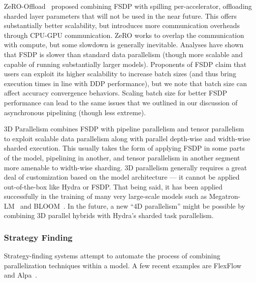ZeRO-Offload~\cite{zerooflload2021} proposed combining FSDP with spilling per-accelerator, offloading sharded layer parameters that will not be used in the near future. This offers substantially better scalability, but introduces more communication overheads through CPU-GPU communication. ZeRO works to overlap the communication with compute, but some slowdown is generally inevitable. Analyses have shown that FSDP is slower than standard data parallelism (though more scalable and capable of running substantially larger models). Proponents of FSDP claim that users can exploit its higher scalability to increase batch sizes (and thus bring execution times in line with DDP performance), but we note that batch size can affect accuracy convergence behaviors. Scaling batch size for better FSDP performance can lead to the same issues that we outlined in our discussion of asynchronous pipelining (though less extreme).

3D Parallelism combines FSDP with pipeline parallelism and tensor parallelism to exploit scalable data parallelism along with parallel depth-wise and width-wise sharded execution. This usually takes the form of applying FSDP in some parts of the model, pipelining in another, and tensor parallelism in another segment more amenable to width-wise sharding. 3D parallelism generally requires a great deal of customization based on the model architecture --- it cannot be applied out-of-the-box like Hydra or FSDP. That being said, it has been applied successfully in the training of many very large-scale models such as Megatron-LM~\cite{megatronlmblog2020} and BLOOM~\cite{bloom2022}. In the future, a new ``4D parallelism'' might be possible by combining 3D parallel hybrids with Hydra's sharded task parallelism.

\subsubsection{Strategy Finding}\label{sec:hybrid_parallel_strategy_finding}
Strategy-finding systems attempt to automate the process of combining parallelization techniques within a model. A few recent examples are FlexFlow~\cite{flexflow2018} and Alpa~\cite{alpa2022}. 

